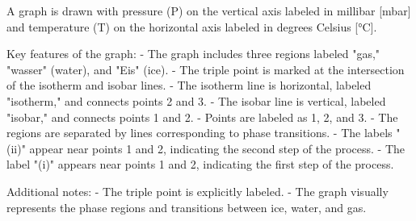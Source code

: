 A graph is drawn with pressure (P) on the vertical axis labeled in millibar [mbar] and temperature (T) on the horizontal axis labeled in degrees Celsius [°C].  

Key features of the graph:  
- The graph includes three regions labeled "gas," "wasser" (water), and "Eis" (ice).  
- The triple point is marked at the intersection of the isotherm and isobar lines.  
- The isotherm line is horizontal, labeled "isotherm," and connects points 2 and 3.  
- The isobar line is vertical, labeled "isobar," and connects points 1 and 2.  
- Points are labeled as 1, 2, and 3.  
- The regions are separated by lines corresponding to phase transitions.  
- The labels "(ii)" appear near points 1 and 2, indicating the second step of the process.  
- The label "(i)" appears near points 1 and 2, indicating the first step of the process.  

Additional notes:  
- The triple point is explicitly labeled.  
- The graph visually represents the phase regions and transitions between ice, water, and gas.